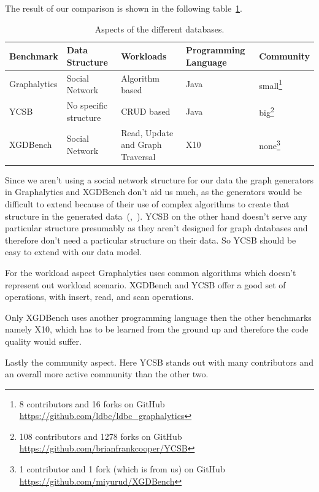 The result of our comparison is shown in the following table~\ref{tab:benchmarkComparison}.

\begin{table}[!h]
  \begin{minipage}{\textwidth}
    \begin{tabularx}{\textwidth}{ | l | X | X | X | l | }
      \hline
      Benchmark & Data Structure & Workloads & Programming Language & Community \\ \hline
      Graphalytics & Social Network & Algorithm based & Java & small\footnote{8 contributors and 16 forks on GitHub \url{https://github.com/ldbc/ldbc_graphalytics}} \\ \hline
      YCSB & No specific structure & CRUD based & Java & big\footnote{108 contributors and 1278 forks on GitHub \url{https://github.com/brianfrankcooper/YCSB}} \\ \hline
      XGDBench & Social Network & Read, Update and Graph Traversal & X10 & none\footnote{1 contributor and 1 fork (which is from us) on GitHub \url{https://github.com/miyurud/XGDBench}} \\ \hline
    \end{tabularx}
  \end{minipage}
  \caption{Aspects of the different databases.}
  \label{tab:benchmarkComparison}
\end{table}

Since we aren't using a social network structure for our data the graph generators in Graphalytics and XGDBench don't aid us much,
as the generators would be difficult to extend because of their use of complex algorithms to create that structure in the generated data~(\cite{Erling2015},~\cite{Dayarathna2012}).
YCSB on the other hand doesn't serve any particular structure presumably as they aren't designed for graph databases and therefore don't need a particular structure on their data.
So YCSB should be easy to extend with our data model.

For the workload aspect Graphalytics uses common algorithms which doesn't represent out workload scenario.
XGDBench  and YCSB offer a good set of operations, with insert, read, and scan operations.

Only XGDBench uses another programming language then the other benchmarks namely X10,
which has to be learned from the ground up and therefore the code quality would suffer.

Lastly the community aspect.
Here YCSB stands out with many contributors and an overall more active community than the other two.

